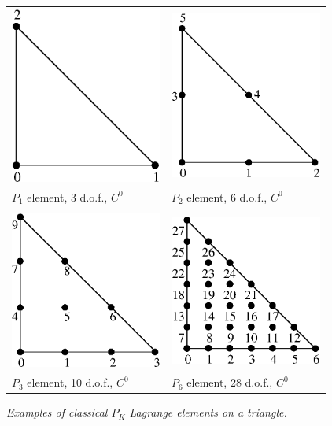 \documentclass[10pt,a4paper]{article}
\begin{document}
\begin{figure}[H]
  \begin{center} \begin{tabular}{m{7cm}m{7cm}}
    \includegraphics[width=5cm,angle=0]{getfemlist_triangle_P1.eps} & \includegraphics[width=5cm,angle=0]{getfemlist_triangle_P2.eps} \\
    $P_1$ element, 3 d.o.f., $C^0$ & $P_2$ element, 6 d.o.f., $C^0$ \\ \\
    \includegraphics[width=5cm,angle=0]{getfemlist_triangle_P3.eps} & \includegraphics[width=5cm,angle=0]{getfemlist_triangle_P6.eps} \\
    $P_3$ element, 10 d.o.f., $C^0$ & $P_6$ element, 28 d.o.f., $C^0$
  \end{tabular} \end{center}
  \caption{ \it Examples of classical $P_K$ Lagrange elements on a triangle.} \label{fig:trianglepk}
\end{figure}
\end{document}
